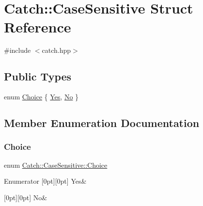 \hypertarget{struct_catch_1_1_case_sensitive}{}\section{Catch\+:\+:Case\+Sensitive Struct Reference}
\label{struct_catch_1_1_case_sensitive}


{\ttfamily \#include $<$catch.\+hpp$>$}

\subsection*{Public Types}
\begin{DoxyCompactItemize}
\item 
enum \mbox{\hyperlink{struct_catch_1_1_case_sensitive_aad49d3aee2d97066642fffa919685c6a}{Choice}} \{ \mbox{\hyperlink{struct_catch_1_1_case_sensitive_aad49d3aee2d97066642fffa919685c6aa7c5550b69ec3c502e6f609b67f9613c6}{Yes}}, 
\mbox{\hyperlink{struct_catch_1_1_case_sensitive_aad49d3aee2d97066642fffa919685c6aa4ffff8d29b481f0116abc37228cd53f6}{No}}
 \}
\end{DoxyCompactItemize}


\subsection{Member Enumeration Documentation}
\mbox{\label{struct_catch_1_1_case_sensitive_aad49d3aee2d97066642fffa919685c6a}} 
\subsubsection{\texorpdfstring{Choice}{Choice}}
{\footnotesize\ttfamily enum \mbox{\hyperlink{struct_catch_1_1_case_sensitive_aad49d3aee2d97066642fffa919685c6a}{Catch\+::\+Case\+Sensitive\+::\+Choice}}}

\begin{DoxyEnumFields}{Enumerator}
[0pt][0pt]{}\mbox{\label{struct_catch_1_1_case_sensitive_aad49d3aee2d97066642fffa919685c6aa7c5550b69ec3c502e6f609b67f9613c6}} 
Yes&\\
\hline

[0pt][0pt]{}\mbox{\label{struct_catch_1_1_case_sensitive_aad49d3aee2d97066642fffa919685c6aa4ffff8d29b481f0116abc37228cd53f6}} 
No&\\
\hline

\end{DoxyEnumFields}


